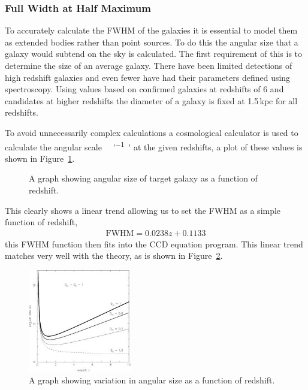 
\subsubsection{Full Width at Half Maximum} %
\label{sub:full_width_at_half_maximum}
	To accurately calculate the FWHM of the galaxies it is essential to model them as extended bodies rather than point sources. To do this the angular size that a galaxy would subtend on the sky is calculated. The first requirement of this is to determine the size of an average galaxy. There have been limited detections of high redshift galaxies and even fewer have had their parameters defined using spectroscopy. Using values based on confirmed galaxies at redshifts of 6 and candidates at higher redshifts\cite{Ono_FWHM}\cite{Bouwens_FWHM}\cite{Jiang_FWHM} the diameter of a galaxy is fixed at 1.5\,kpc for all redshifts.

	To avoid unnecessarily complex calculations a cosmological calculator\cite{Ned_Calc} is used to calculate the angular scale \si{\kilo\parsec\per ''} at the given redshifts, a plot of these values is shown in Figure~\ref{fig:redshift_vs_angular_size}.
	\begin{figure}[htbp]
		\centering
			\begingroup{}
				\resizebox{0.6\textwidth}{!}{%
					
				}\endgroup
		\caption{A graph showing angular size of target galaxy as a function of redshift.\label{fig:redshift_vs_angular_size}}
	\end{figure}

	This clearly shows a linear trend allowing us to set the FWHM as a simple function of redshift,
	\begin{align}
		\text{FWHM}= 0.0238z + 0.1133
	\end{align}
	this FWHM function then fits into the CCD equation program. This linear trend matches very well with the theory, as is shown in Figure~\ref{fig:angular_size_function_of_redshift}.
	\begin{figure}[htbp]
		\centering
		\includegraphics[width=0.4\textwidth]{../Images/angular_size_function_of_redshift.jpeg}
		\caption{A graph showing variation in angular size as a function of redshift\cite{Sahni_FWHM}.\label{fig:angular_size_function_of_redshift}}
	\end{figure}

